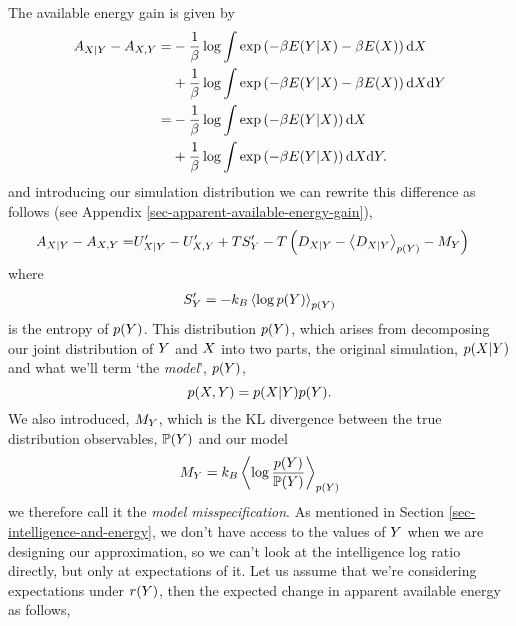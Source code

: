 \documentclass[]{article}
\begin{document}
The available energy gain is given by
\begin{align*}
A_{X|Y} - A_{X,Y} = & -\frac{1}{\beta} \log \int \exp\left(-\beta E(Y|X) -\beta E(X)\right) \text{d}X \\
& +\frac{1}{\beta} \log \int \exp\left(-\beta E(Y|X) -\beta E(X)\right) \text{d}X\text{d}Y \\
= & -\frac{1}{\beta} \log \int \exp\left(-\beta E(Y|X) \right) \text{d}X \\
& +\frac{1}{\beta} \log \int \exp\left(-\beta E(Y|X) \right) \text{d}X\text{d}Y .
\end{align*}
%
and introducing our simulation distribution we can rewrite this difference as follows (see Appendix \ref{sec-apparent-available-energy-gain}),
%
\begin{align*}
A_{X|Y} - A_{X,Y} =  & U^\prime_{X|Y} - U^\prime_{X,Y} + TS^\prime_Y - T\left(D_{X|Y} - \left\langle D_{X|Y} \right\rangle_{p(Y)} - M_{Y}\right)
\end{align*} 
where 
\[
S^\prime_{Y}=-k_B\left\langle \log p(Y)  \right\rangle_{p(Y) }
\] 
is the entropy of $p(Y)$. This distribution $p(Y)$, which arises from decomposing our joint distribution of $Y$ and $X$ into two parts, the original simulation, $p(X |Y)$ and what we'll term `the \emph{model}', $p(Y)$,
\[
p(X ,Y) = p(X |Y)p(Y).
\]
We also introduced, 
\(M_{Y}\), which is the KL divergence between the true distribution observables, $\mathbb{P}(Y)$ and our model
\[
M_{Y} = k_B \left\langle \log \frac{p( Y)}{\mathbb{P}(Y) } \right\rangle_{p(Y) }
\]
we therefore call it the \emph{model misspecification}.
%
As mentioned in Section \ref{sec-intelligence-and-energy}, we don't have access to the values of $Y$ when we are designing our approximation, so we can't look at the intelligence log ratio directly, but only at expectations of it. Let us assume that we're considering expectations under $r(Y)$, then the expected change in apparent available energy as follows,
\end{document}
